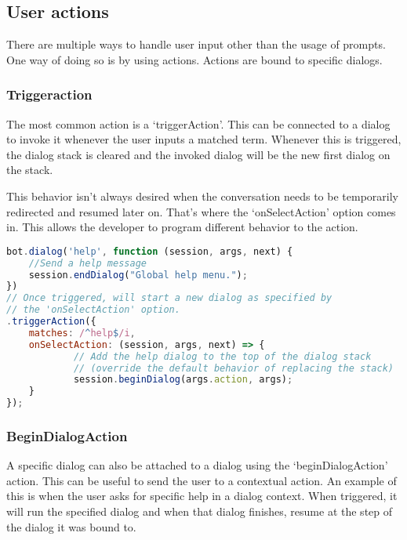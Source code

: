 \subsection{User actions}

There are multiple ways to handle user input other than the usage of prompts. One way of doing so is by using actions. Actions are bound to specific dialogs.

\subsubsection{Triggeraction}

The most common action is a `triggerAction'. This can be connected to a dialog to invoke it whenever the user inputs a matched term. Whenever this is triggered, the dialog stack is cleared and the invoked dialog will be the new first dialog on the stack.

This behavior isn't always desired when the conversation needs to be temporarily redirected and resumed later on. That's where the `onSelectAction' option comes in. This allows the developer to program different behavior to the action.

\begin{lstlisting}[language=JavaScript,caption=triggerAction being bound to a dialog and its behavior overwritten by onSelectAction,label=listing:triggerAction]
bot.dialog('help', function (session, args, next) {
	//Send a help message
	session.endDialog("Global help menu.");
})
// Once triggered, will start a new dialog as specified by
// the 'onSelectAction' option.
.triggerAction({
	matches: /^help$/i,
	onSelectAction: (session, args, next) => {
			// Add the help dialog to the top of the dialog stack 
			// (override the default behavior of replacing the stack)
			session.beginDialog(args.action, args);
	}
});
\end{lstlisting}

\subsubsection{BeginDialogAction}

A specific dialog can also be attached to a dialog using the `beginDialogAction' action. This can be useful to send the user to a contextual action. An example of this is when the user asks for specific help in a dialog context. When triggered, it will run the specified dialog and when that dialog finishes, resume at the step of the dialog it was bound to.


